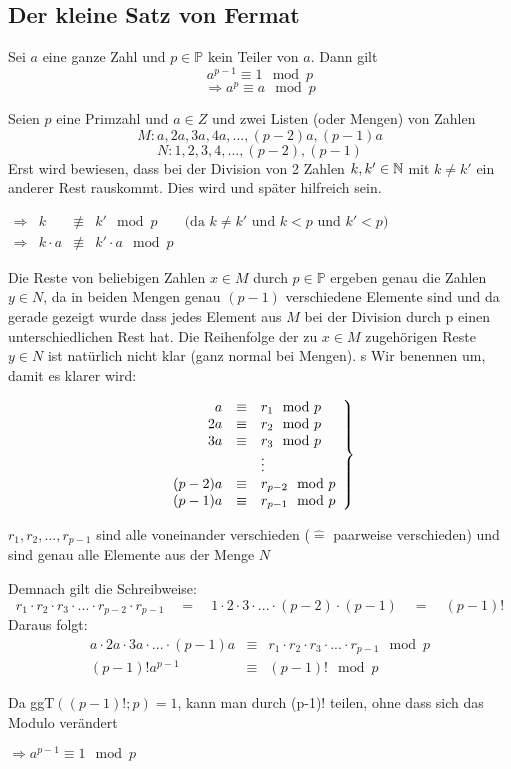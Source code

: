\documentclass[main.tex]{subfiles}
\begin{document}
\subsection{Der kleine Satz von Fermat}

\begin{Definition}
	Sei $a$ eine ganze Zahl und $p \in \mathbb{P}$ kein Teiler von $a$. Dann gilt
	$$a^{p-1} \equiv 1 \mod p$$
	$$\Rightarrow a^p \equiv a \mod p$$
\end{Definition}

\begin{Beweis}
	Seien $p$ eine Primzahl und $a \in Z$ und zwei Listen (oder Mengen) von Zahlen
	$$M: a, 2a, 3a, 4a, ..., (p-2)a, (p-1)a$$
	$$N: 1, 2, 3, 4, ..., (p-2), (p-1)$$
	Erst wird bewiesen, dass bei der Division von 2 Zahlen $k,k' \in \mathbb{N}$ mit $k \neq k'$ ein anderer Rest rauskommt. Dies wird und später hilfreich sein.

	$\begin{array}{rcccl}
		\Rightarrow & k & \not\equiv & k' \mod p  & \text{(da $k \neq k'$ und $k<p$ und $k'<p$)} \\
		\Rightarrow & k \cdot a & \not\equiv & k' \cdot a \mod p  &
	\end{array}$
	
	Die Reste von beliebigen Zahlen $x \in M$ durch $p \in \mathbb{P}$ ergeben genau die Zahlen $y \in N$, da in beiden Mengen genau $(p-1)$ verschiedene Elemente sind und da gerade gezeigt wurde dass jedes Element aus $M$ bei der Division durch p einen unterschiedlichen Rest hat. Die Reihenfolge der zu $x \in M$ zugehörigen Reste $y \in N$  ist natürlich nicht klar (ganz normal bei Mengen).
	s
	Wir benennen um, damit es klarer wird:

	$$\left.\begin{array}{r c l}
		a & \equiv & r_{1} \mod p\\
		2a & \equiv & r_{2} \mod p \\
		3a & \equiv & r_{3} \mod p \\
		& & \vdots \\
		(p - 2)a & \equiv & r_{p-2} \mod p \\
		(p - 1)a & \equiv & r_{p-1} \mod p
	\end{array} \right\}$$

	$r_{1}, r_{2}, ..., r_{p-1}$ sind alle voneinander verschieden ($\widehat{=}$ paarweise verschieden) und sind genau alle Elemente aus der Menge $N$
	
	Demnach gilt die Schreibweise:
	$$r_1 \cdot r_2 \cdot r_3 \cdot ... \cdot r_{p-2} \cdot r_{p-1} \quad = \quad 1 \cdot 2 \cdot 3 \cdot ... \cdot (p-2) \cdot (p-1) \quad = \quad (p-1)! $$
	Daraus folgt:
	$$\begin{array}{rcl}
		 a \cdot 2a \cdot 3a \cdot ... \cdot (p-1)a & \equiv & r_1 \cdot r_2 \cdot r_3 \cdot ... \cdot r_{p-1} \mod p \\
		(p-1)! a^{p-1} & \equiv & (p-1)! \mod p
	\end{array}$$

	Da ggT$\left ( (p-1)! ; p \right ) = 1$, kann man durch (p-1)! teilen, ohne dass sich das Modulo verändert
	
	$ \Rightarrow a^{p-1} \equiv 1 \mod p$
\end{Beweis}
\end{document}
